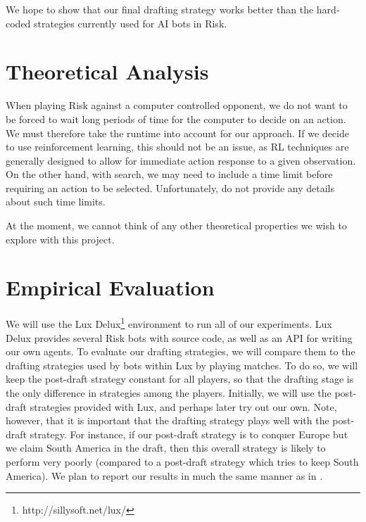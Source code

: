 \documentclass[letterpaper]{article}
\numberwithin{equation}{section}
\numberwithin{theorem}{section}
\numberwithin{lemma}{section}
\numberwithin{df}{section}
\begin{document}

We hope to show that our final drafting strategy works better than the hard-coded strategies currently used for AI bots in Risk.

\section{Theoretical Analysis}

When playing Risk against a computer controlled opponent, we do not want to be forced to wait long periods of time for the computer to decide on an action.  We must therefore take the runtime into account for our approach.  If we decide to use reinforcement learning, this should not be an issue, as RL techniques are generally designed to allow for immediate action response to a given observation.  On the other hand, with search, we may need to include a time limit before requiring an action to be selected.  Unfortunately, \cite{ZuckFelnerKraus2009} do not provide any details about such time limits.  

At the moment, we cannot think of any other theoretical properties we wish to explore with this project.

\section{Empirical Evaluation}

We will use the Lux Delux\footnote{http://sillysoft.net/lux/} environment to run all of our experiments.  Lux Delux provides several Risk bots with source code, as well as an API for writing our own agents.  To evaluate our drafting strategies, we will compare them to the drafting strategies used by bots within Lux by playing matches.  To do so, we will keep the post-draft strategy constant for all players, so that the drafting stage is the only difference in strategies among the players.  Initially, we will use the post-draft strategies provided with Lux, and perhaps later try out our own.  Note, however, that it is important that the drafting strategy plays well with the post-draft strategy.  For instance, if our post-draft strategy is to conquer Europe but we claim South America in the draft, then this overall strategy is likely to perform very poorly (compared to a post-draft strategy which tries to keep South America).  We plan to report our results in much the same manner as in \cite{ZuckFelnerKraus2009}.
\end{document}
